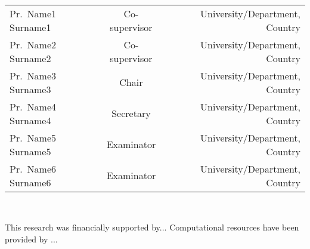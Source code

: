 \\
\vspace{1.0\baselineskip}
\begin{tabular}{lcr}
Pr.~Name1 {\sffamily Surname1} & Co-supervisor & University/Department, Country\\
Pr.~Name2 {\sffamily Surname2} & Co-supervisor  & University/Department, Country\\
Pr.~Name3 {\sffamily Surname3} & Chair & University/Department, Country\\
Pr.~Name4 {\sffamily Surname4} & Secretary & University/Department, Country\\
Pr.~Name5 {\sffamily Surname5} & Examinator & University/Department, Country\\
Pr.~Name6 {\sffamily Surname6} & Examinator & University/Department, Country\\
\end{tabular}

\vspace{5\baselineskip}

\\
\vspace{1.0\baselineskip}
\begin{center}
    \begin{minipage}{0.8\textwidth}
        {This research was financially supported by...
        \vspace{0.5\baselineskip}
        \noindent Computational resources have been provided by ...}
    \end{minipage}
\end{center}
\endgroup





